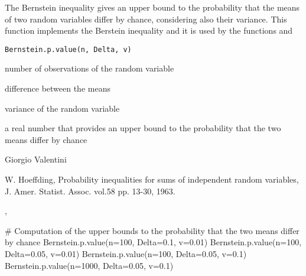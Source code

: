 \documentclass{article}
\begin{document}
\begin{Description}\relax
The Bernstein inequality gives an upper bound to the probability that the means of two random variables differ by chance, considering also their variance.
This function implements the Berstein inequality and it is used by the functions  and
\end{Description}
\begin{Usage}
\begin{verbatim}
Bernstein.p.value(n, Delta, v)
\end{verbatim}
\end{Usage}
\begin{Arguments}
\begin{ldescription}
\item[\code{n}] number of observations of the random variable 
\item[\code{Delta}] difference between the means 
\item[\code{v}] variance of the random variable 
\end{ldescription}
\end{Arguments}
\begin{Value}
a real number that provides an upper bound to the probability that the two means differ by chance
\end{Value}
\begin{Author}\relax
Giorgio Valentini 
\end{Author}
\begin{References}\relax
W. Hoeffding, Probability inequalities for sums of independent random variables, J. Amer. Statist. Assoc. vol.58 pp. 13-30, 1963.
\end{References}
\begin{SeeAlso}\relax
{}, 
\end{SeeAlso}
\begin{Examples}
\begin{ExampleCode}
# Computation of the upper bounds to the probability that the two means differ by chance
Bernstein.p.value(n=100, Delta=0.1, v=0.01)
Bernstein.p.value(n=100, Delta=0.05, v=0.01)
Bernstein.p.value(n=100, Delta=0.05, v=0.1)
Bernstein.p.value(n=1000, Delta=0.05, v=0.1)
\end{ExampleCode}
\end{Examples}
\end{document}
